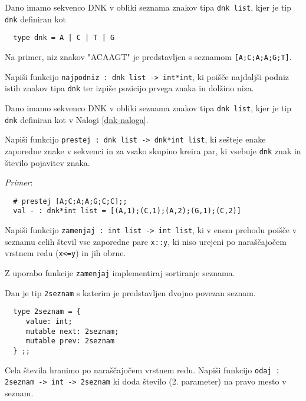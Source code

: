 \begin{ex}
  \label{dnk-naloga}
  Dano imamo sekvenco DNK v obliki seznama znakov tipa \texttt{dnk list},
  kjer je tip \texttt{dnk} definiran kot

  \begin{verbatim}
  type dnk = A | C | T | G
  \end{verbatim}
 
  Na primer, niz znakov "ACAAGT" je predstavljen s seznamom 
  \texttt{[A;\-C;A;A;G;T]}. 

  Napi\v si funkcijo \texttt{najpodniz : dnk list -> int*int}, ki
  poi\v s\v ce najdalj\v si podniz istih znakov tipa \texttt{dnk} ter
  izpi\v se pozicijo prvega znaka in dol\v zino niza.


\end{ex} 
\begin{ex}
  Dano imamo sekvenco DNK v obliki seznama znakov tipa \texttt{dnk list},
  kjer je tip \texttt{dnk} definiran kot v Nalogi \ref{dnk-naloga}.

  Napi\v si funkcijo \texttt{prestej : dnk list -> dnk*int list}, ki
  se\v steje enake zaporedne znake v sekvenci in za vsako skupino
  kreira par, ki vsebuje \texttt{dnk} znak in \v stevilo pojavitev
  znaka.

  \emph{Primer}: 
  \begin{verbatim}
  # prestej [A;C;A;A;G;C;C];;
  val - : dnk*int list = [(A,1);(C,1);(A,2);(G,1);(C,2)]
  \end{verbatim}


\end{ex} 
\begin{ex}
  Napi\v si funkcijo \texttt{zamenjaj : int list -> int list}, ki v
  enem prehodu poi\v s\v ce v seznamu celih \v stevil vse zaporedne
  pare \texttt{x::y}, ki niso urejeni po nara\v s\v cajo\v cem vrstnem
  redu (\texttt{x<=y}) in jih obrne.

  Z uporabo funkcije \texttt{zamenjaj} implementiraj sortiranje seznama.


\end{ex} 
\begin{ex}
  Dan je tip \texttt{2seznam} s katerim je predstavljen dvojno povezan
  seznam.

  \begin{verbatim}
  type 2seznam = {
     value: int;
     mutable next: 2seznam;
     mutable prev: 2seznam
  } ;;
  \end{verbatim}

  Cela \v stevila hranimo po nara\v s\v cajo\v cem vrstnem
  redu. Napi\v si funkcijo \texttt{odaj : 2seznam -> int -> 2seznam}
  ki doda \v stevilo (2. parameter) na pravo mesto v seznam.



\end{ex} 
